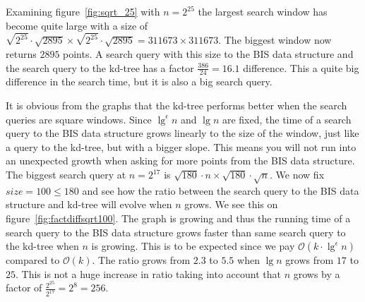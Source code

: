 
Examining figure~\ref{fig:sqrt_25} with $n = 2^{25}$ the largest search window has become quite large with a size of $\sqrt{2^{25}}\cdot\sqrt{2895} \times \sqrt{2^{25}}\cdot\sqrt{2895} = 311673 \times 311673$. The biggest window now returns $2895$ points. A search query with this size to the BIS data structure and the search query to the kd-tree has a factor $\frac{386}{24} = 16.1$ difference. This a quite big difference in the search time, but it is also a big search query.

It is obvious from the graphs that the kd-tree performs better when the search queries are square windows. Since $\lg^\epsilon n$ and $\lg n$ are fixed, the time of a search query to the BIS data structure grows linearly to the size of the window, just like a query to the kd-tree, but with a bigger slope. This means you will not run into an unexpected growth when asking for more points from the BIS data structure. \\

The biggest search query at $n = 2^{17}$ is $\sqrt{180}\cdot{n} \times \sqrt{180}\cdot\sqrt{n}$. We now fix $size = 100 \leq 180$ and see how the ratio between the search query to the BIS data structure and kd-tree will evolve when $n$ grows. We see this on figure~\ref{fig:factdiffsqrt100}. The graph is growing and thus the running time of a search query to the BIS data structure grows faster than same search query to the kd-tree when $n$ is growing. This is to be expected since we pay $\mathcal{O}(k\cdot\lg^\epsilon n)$ compared to $\mathcal{O}(k)$. The ratio grows from $2.3$ to $5.5$ when $\lg n$ grows from $17$ to $25$. This is not a huge increase in ratio taking into account that $n$ grows by a factor of $\frac{2^{25}}{2^{17}} = 2^8 = 256$.

